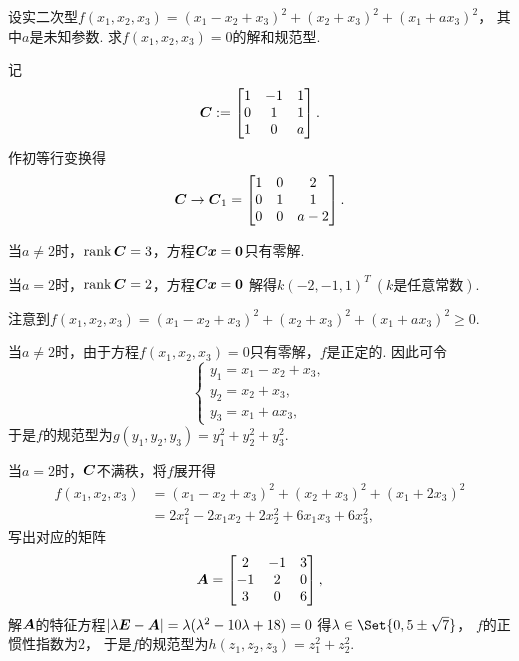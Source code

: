 \begin{example}
设实二次型\(f(x_1,x_2,x_3) = (x_1-x_2+x_3)^2 + (x_2+x_3)^2 + (x_1+ax_3)^2\)，
其中\(a\)是未知参数.
求\(f(x_1,x_2,x_3)=0\)的解和规范型.
\begin{solution}
记\begin{equation*}
	\boldsymbol{C} := \begin{bmatrix}
		1 & -1 & 1 \\
		0 & 1 & 1 \\
		1 & 0 & a
	\end{bmatrix}.
\end{equation*}
作初等行变换得\begin{equation*}
	\boldsymbol{C} \to \boldsymbol{C}_1 = \begin{bmatrix}
		1 & 0 & 2 \\
		0 & 1 & 1 \\
		0 & 0 & a-2
	\end{bmatrix}.
\end{equation*}

当\(a\neq2\)时，\(\rank\boldsymbol{C}=3\)，方程\(\boldsymbol{C}\boldsymbol{x}=\boldsymbol0\)只有零解.

当\(a=2\)时，\(\rank\boldsymbol{C}=2\)，方程\(\boldsymbol{C}\boldsymbol{x}=\boldsymbol0\)
解得\(k (-2,-1,1)^T\ (\text{$k$是任意常数})\).

注意到\(f(x_1,x_2,x_3) = (x_1-x_2+x_3)^2 + (x_2+x_3)^2 + (x_1+ax_3)^2 \geq 0\).

当\(a\neq2\)时，由于方程\(f(x_1,x_2,x_3)=0\)只有零解，\(f\)是正定的.
因此可令\begin{equation*}
	\left\{ \begin{array}{l}
		y_1 = x_1-x_2+x_3, \\
		y_2 = x_2+x_3, \\
		y_3 = x_1+ax_3,
	\end{array} \right.
\end{equation*}
于是\(f\)的规范型为\(g(y_1,y_2,y_3) = y_1^2 + y_2^2 + y_3^2\).

当\(a=2\)时，\(\boldsymbol{C}\)不满秩，将\(f\)展开得\begin{align*}
	f(x_1,x_2,x_3) &= (x_1-x_2+x_3)^2 + (x_2+x_3)^2 + (x_1+2x_3)^2 \\
	&= 2 x_1^2 - 2 x_1 x_2 + 2 x_2^2 + 6 x_1 x_3 + 6 x_3^2,
\end{align*}
写出对应的矩阵\begin{equation*}
	\boldsymbol{A} = \begin{bmatrix}
		2 & -1 & 3 \\
		-1 & 2 & 0 \\
		3 & 0 & 6
	\end{bmatrix},
\end{equation*}
解\(\boldsymbol{A}\)的特征方程\(\abs{\lambda\boldsymbol{E}-\boldsymbol{A}}=\lambda(\lambda^2-10\lambda+18)=0\)
得\(\lambda\in\Set{0,5\pm\sqrt7}\)，
\(f\)的正惯性指数为\(2\)，
于是\(f\)的规范型为\(h(z_1,z_2,z_3) = z_1^2+z_2^2\).
\end{solution}
\end{example}

